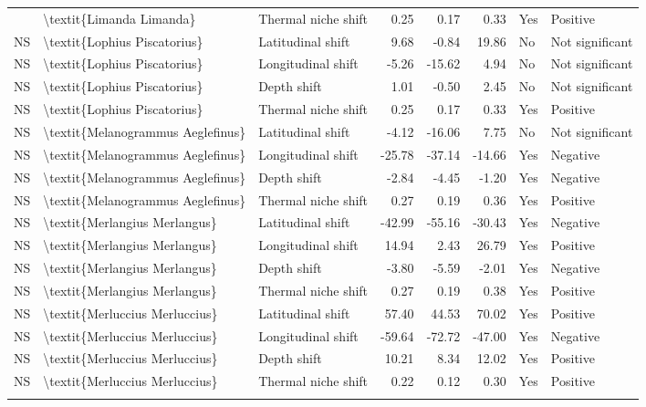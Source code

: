 \begin{longtable}[t]{lllrrrll}
{{NS & \textbackslash{}textit\{Limanda Limanda\} & Thermal niche shift & 0.25 & 0.17 & 0.33 & Yes & Positive\\
NS & \textbackslash{}textit\{Lophius Piscatorius\} & Latitudinal shift & 9.68 & -0.84 & 19.86 & No & Not significant\\
NS & \textbackslash{}textit\{Lophius Piscatorius\} & Longitudinal shift & -5.26 & -15.62 & 4.94 & No & Not significant\\
\addlinespace
NS & \textbackslash{}textit\{Lophius Piscatorius\} & Depth shift & 1.01 & -0.50 & 2.45 & No & Not significant\\
NS & \textbackslash{}textit\{Lophius Piscatorius\} & Thermal niche shift & 0.25 & 0.17 & 0.33 & Yes & Positive\\
NS & \textbackslash{}textit\{Melanogrammus Aeglefinus\} & Latitudinal shift & -4.12 & -16.06 & 7.75 & No & Not significant\\
NS & \textbackslash{}textit\{Melanogrammus Aeglefinus\} & Longitudinal shift & -25.78 & -37.14 & -14.66 & Yes & Negative\\
NS & \textbackslash{}textit\{Melanogrammus Aeglefinus\} & Depth shift & -2.84 & -4.45 & -1.20 & Yes & Negative\\
\addlinespace
NS & \textbackslash{}textit\{Melanogrammus Aeglefinus\} & Thermal niche shift & 0.27 & 0.19 & 0.36 & Yes & Positive\\
NS & \textbackslash{}textit\{Merlangius Merlangus\} & Latitudinal shift & -42.99 & -55.16 & -30.43 & Yes & Negative\\
NS & \textbackslash{}textit\{Merlangius Merlangus\} & Longitudinal shift & 14.94 & 2.43 & 26.79 & Yes & Positive\\
NS & \textbackslash{}textit\{Merlangius Merlangus\} & Depth shift & -3.80 & -5.59 & -2.01 & Yes & Negative\\
NS & \textbackslash{}textit\{Merlangius Merlangus\} & Thermal niche shift & 0.27 & 0.19 & 0.38 & Yes & Positive\\
\addlinespace
NS & \textbackslash{}textit\{Merluccius Merluccius\} & Latitudinal shift & 57.40 & 44.53 & 70.02 & Yes & Positive\\
NS & \textbackslash{}textit\{Merluccius Merluccius\} & Longitudinal shift & -59.64 & -72.72 & -47.00 & Yes & Negative\\
NS & \textbackslash{}textit\{Merluccius Merluccius\} & Depth shift & 10.21 & 8.34 & 12.02 & Yes & Positive\\
NS & \textbackslash{}textit\{Merluccius Merluccius\} & Thermal niche shift & 0.22 & 0.12 & 0.30 & Yes & Positive\\
}}
\end{longtable}
